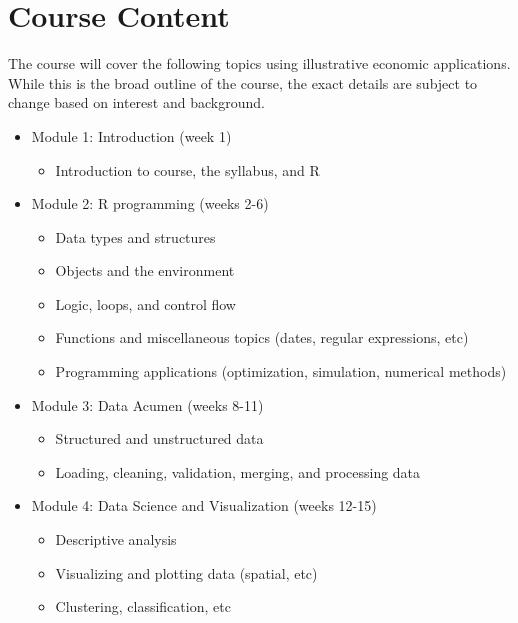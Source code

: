\documentclass[11pt]{article}
\begin{document}
\section*{Course Content}
The course will cover the following topics using illustrative economic applications. While this is the broad outline of the course, the exact details are subject to change based on interest and background.


\begin{itemize}
	\item Module 1: Introduction (week 1)
	\begin{itemize}
    	\item Introduction to course, the syllabus, and R
	\end{itemize}
	
	\item Module 2: R programming (weeks 2-6)
	\begin{itemize}
    	\item Data types and structures
    	\item Objects and the environment
    	\item Logic, loops, and control flow
    	\item Functions and miscellaneous topics (dates, regular expressions, etc)
    	\item Programming applications (optimization, simulation, numerical methods)
	\end{itemize} 
	
	\item Module 3: Data Acumen (weeks 8-11)
	\begin{itemize}
    	\item Structured and unstructured data
    	\item Loading, cleaning, validation, merging, and processing data
	\end{itemize}  
	
	\item Module 4: Data Science and Visualization (weeks 12-15)
	\begin{itemize}
    	\item Descriptive analysis
    	\item Visualizing and plotting data (spatial, etc)
    	\item Clustering, classification, etc
	\end{itemize}   
\end{itemize}
\end{document}
